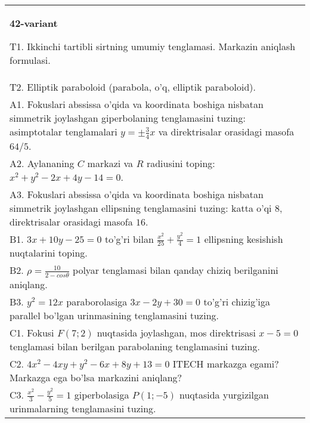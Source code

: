 \documentclass{article}
\begin{document}
\begin{tabular}{m{17cm}}
\textbf{42-variant}
\newline

T1. Ikkinchi tartibli sirtning umumiy tenglamasi. Markazin aniqlash formulasi.\\

T2. Elliptik paraboloid (parabola, o'q, elliptik paraboloid).\\

A1. Fokuslari abssissa o'qida va koordinata boshiga nisbatan simmetrik joylashgan giperbolaning tenglamasini tuzing: asimptotalar tenglamalari $y=\pm \frac{3}{4}x$ va direktrisalar orasidagi masofa $64/5$.\\

A2. Aylananing $C$ markazi va $R$ radiusini toping: $x^2+y^2-2x+4y-14=0$.\\

A3. Fokuslari abssissa o'qida va koordinata boshiga nisbatan simmetrik joylashgan ellipsning tenglamasini tuzing: katta o'qi $8$, direktrisalar orasidagi masofa $16$.\\

B1. $3x + 10y - 25 = 0$ to'g'ri bilan $\frac{x^{2}}{25} + \frac{y^{2}}{4} = 1$ ellipsning kesishish nuqtalarini toping.  \\

B2. $\rho = \frac{10}{2 - cos\theta}$ polyar tenglamasi bilan qanday chiziq berilganini aniqlang.  \\

B3. $y^{2} = 12x$ paraborolasiga $3x - 2y + 30 = 0$ to'g'ri chizig'iga parallel bo'lgan urinmasining tenglamasini tuzing.  \\

C1. Fokusi $F(7;2)$ nuqtasida joylashgan, mos direktrisasi $x - 5 = 0$ tenglamasi bilan berilgan parabolaning tenglamasini tuzing.  \\

C2. $4x^{2} - 4xy + y^{2} - 6x + 8y + 13 = 0$ ITECH markazga egami? Markazga ega bo'lsa markazini aniqlang?  \\

C3. $\frac{x^{2}}{3} - \frac{y^{2}}{5} = 1$ giperbolasiga $P(1; - 5)$ nuqtasida yurgizilgan urinmalarning tenglamasini tuzing.\\

\end{tabular}
\vspace{1cm}
\end{document}
